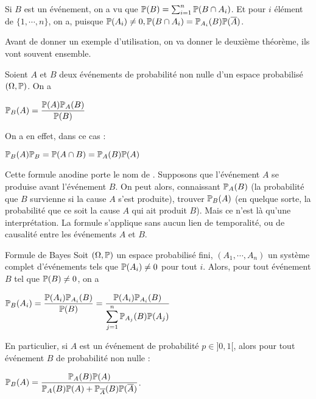 \documentclass[12pt,a4paper]{report}
\begin{document}
\begin{demo}{}
Si $B$ est un événement, on a vu que $\mathbb{P}(B) = \sum_{i=1}^n \mathbb{P}(B \cap A_i)$. Et pour $i$ élément de $\{1,\cdots,n\}$, on a, puisque $\mathbb{P}(A_i) \ne 0, \mathbb{P}(B \cap A_i) = \mathbb{P}_{A_i}(B)\mathbb{P}(\overline{A})$.
\end{demo}

Avant de donner un exemple d'utilisation, on va donner le deuxième théorème, ils vont souvent ensemble.

\begin{lemme}{}{}
Soient $A$ et $B$ deux événements de probabilité non nulle d'un espace probabilisé $(\Omega, \mathbb{P})$. On a
\begin{center}
$\mathbb{P}_B(A) = \dfrac{\mathbb{P}(A) \mathbb{P}_A(B)}{\mathbb{P}(B)}$
\end{center}
\end{lemme}

\begin{demo}{}
On a en effet, dans ce cas :
\begin{center}
$\mathbb{P}_B(A)\mathbb{P}_B = \mathbb{P}(A \cap B) = \mathbb{P}_A(B) \mathbb{P}(A)$
\end{center}
\end{demo}

\begin{remarque}{}
Cette formule anodine porte le nom de . Supposons que l'événement $A$ se produise avant l'événement $B$. On peut alors, connaissant $\mathbb{P}_A(B)$ (la probabilité que $B$ survienne si la cause $A$ s'est produite), trouver $\mathbb{P}_B(A)$ (en quelque sorte, la probabilité que ce soit la cause $A$ qui ait produit $B$). Mais ce n'est là qu'une interprétation. La formule s'applique sans aucun lien de temporalité, ou de causalité entre les événements $A$ et $B$.
\end{remarque}

\begin{theoreme}{Formule de Bayes}{}
Soit $(\Omega, \mathbb{P})$ un espace probabilisé fini, $(A_1,\cdots,A_n)$ un système complet d'événements tels que $\mathbb{P}(A_i) \ne 0$ pour tout $i$. Alors, pour tout événement $B$ tel que $\mathbb{P}(B) \ne 0$, on a 
\begin{center}
$\mathbb{P}_B(A_i) = \dfrac{\mathbb{P}(A_i)\mathbb{P}_{A_i}(B)}{\mathbb{P}(B)} = \dfrac{\mathbb{P}(A_i) \mathbb{P}_{A_i}(B)}{\displaystyle \sum_{j=1}^n \mathbb{P}_{A_j}(B) \mathbb{P}(A_j)}$
\end{center}

En particulier, si $A$ est un événement de probabilité $p \in ]0,1[$, alors pour tout événement $B$ de probabilité non nulle :
\begin{center}
$\mathbb{P}_B(A) = \dfrac{\mathbb{P}_A(B) \mathbb{P}(A)}{\mathbb{P}_A(B) \mathbb{P}(A) + \mathbb{P}_{\overline{A}}(B) \mathbb{P}(\overline{A})}$.
\end{center}
\end{theoreme}
\end{document}
